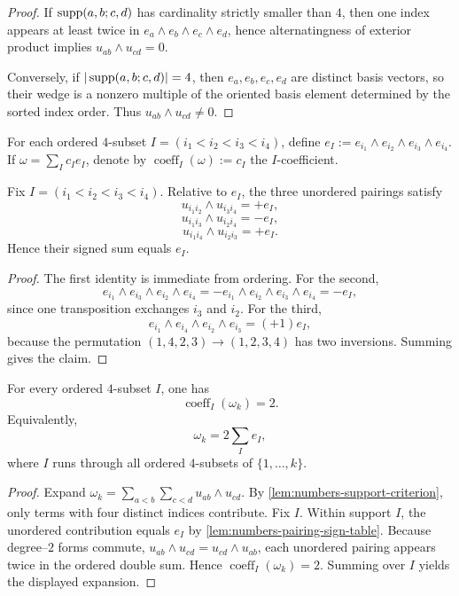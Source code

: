 \begin{proof}
If \(\operatorname{supp}(a,b;c,d)\) has cardinality strictly smaller than \(4\), then one
index appears at least twice in
\(e_a\wedge e_b\wedge e_c\wedge e_d\), hence alternatingness of exterior
product implies
\(u_{ab}\wedge u_{cd}=0\).

Conversely, if \(|\operatorname{supp}(a,b;c,d)|=4\), then
\(e_a,e_b,e_c,e_d\) are distinct basis vectors, so their wedge is a nonzero
multiple of the oriented basis element determined by the sorted index order.
Thus \(u_{ab}\wedge u_{cd}\neq0\).
\end{proof}

\begin{definition}
\label{def:numbers-coefficient-extraction}
For each ordered \(4\)-subset
\(I=(i_1<i_2<i_3<i_4)\), define
\(e_I:=e_{i_1}\wedge e_{i_2}\wedge e_{i_3}\wedge e_{i_4}\).
If
\(\omega=\sum_I c_I e_I\), denote by
\(\operatorname{coeff}_I(\omega):=c_I\) the \(I\)-coefficient.
\end{definition}

\begin{lemma}
\label{lem:numbers-pairing-sign-table}
Fix \(I=(i_1<i_2<i_3<i_4)\).
Relative to \(e_I\), the three unordered pairings satisfy
\[
  u_{i_1i_2}\wedge u_{i_3i_4}=+e_I,
\]
\[
  u_{i_1i_3}\wedge u_{i_2i_4}=-e_I,
\]
\[
  u_{i_1i_4}\wedge u_{i_2i_3}=+e_I.
\]
Hence their signed sum equals \(e_I\).
\end{lemma}

\begin{proof}
The first identity is immediate from ordering.
For the second,
\[
  e_{i_1}\wedge e_{i_3}\wedge e_{i_2}\wedge e_{i_4}
  =-e_{i_1}\wedge e_{i_2}\wedge e_{i_3}\wedge e_{i_4}
  =-e_I,
\]
since one transposition exchanges \(i_3\) and \(i_2\).
For the third,
\[
  e_{i_1}\wedge e_{i_4}\wedge e_{i_2}\wedge e_{i_3}
  =(+1)e_I,
\]
because the permutation
\((1,4,2,3)\to(1,2,3,4)\) has two inversions.
Summing gives the claim.
\end{proof}

\begin{proposition}
\label{prop:numbers-uniform-coefficient}
For every ordered \(4\)-subset \(I\), one has
\[
  \operatorname{coeff}_I(\omega_k)=2.
\]
Equivalently,
\[
  \omega_k=2\sum_I e_I,
\]
where \(I\) runs through all ordered \(4\)-subsets of
\(\{1,\dots,k\}\).
\end{proposition}

\begin{proof}
Expand
\(
  \omega_k=\sum_{a<b}\sum_{c<d}u_{ab}\wedge u_{cd}
\).
By \cref{lem:numbers-support-criterion}, only terms with four distinct
indices contribute.
Fix \(I\).
Within support \(I\), the unordered contribution equals \(e_I\) by
\cref{lem:numbers-pairing-sign-table}.
Because degree--\(2\) forms commute,
\(
  u_{ab}\wedge u_{cd}=u_{cd}\wedge u_{ab}
\),
each unordered pairing appears twice in the ordered double sum.
Hence \(\operatorname{coeff}_I(\omega_k)=2\).
Summing over \(I\) yields the displayed expansion.
\end{proof}

